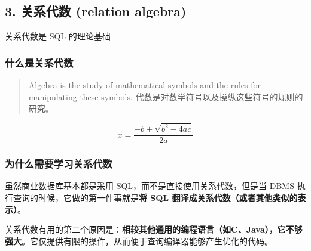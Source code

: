 \documentclass[aspectratio=169, 14pt]{beamer}
\begin{document}
\begin{frame}
	\section{\textcolor{darkmidnightblue}{3. 关系代数 (relation algebra)}}
	关系代数是 SQL 的理论基础
\end{frame}

\begin{frame}
	\frametitle{什么是关系代数}
	\begin{quote}
		Algebra is the study of mathematical symbols and the rules for manipulating these symbols.
		代数是对数学符号以及操纵这些符号的规则的研究。
	\end{quote}

	\[x = \frac{-b \pm \sqrt{b^2 - 4ac}}{2a}\]


\end{frame}

\begin{frame}
	\frametitle{为什么需要学习关系代数}
	虽然商业数据库基本都是采用 SQL，而不是直接使用关系代数，但是当 DBMS 执行查询的时候，它做的第一件事就是\textbf{将 SQL 翻译成关系代数（或者其他类似的表示）}。


	关系代数有用的第二个原因是：\textbf{相较其他通用的编程语言（如C、Java），它不够强大}。它仅提供有限的操作，从而便于查询编译器能够产生优化的代码。

\end{frame}
\end{document}
